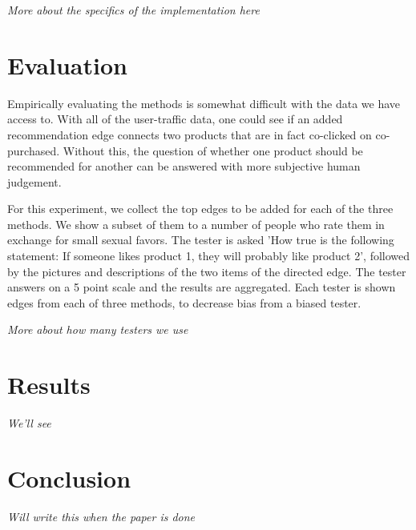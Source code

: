 \documentclass[10pt]{article}
\begin{document}
\emph{More about the specifics of the implementation here}

\section*{Evaluation}
Empirically evaluating the methods is somewhat difficult with the data we have
access to. With all of the user-traffic data, one could see if an added
recommendation edge connects two products that are in fact co-clicked on
co-purchased. Without this, the question of whether one product should be
recommended for another can be answered with more subjective human judgement.

For this experiment, we collect the top edges to be added for each of the three
methods. We show a subset of them to a number of people who rate them in
exchange for small sexual favors. The tester is asked 'How true is the
following statement: If someone likes product 1, they will probably like
product 2', followed by the pictures and descriptions of the two items of the
directed edge. The tester answers on a 5 point scale and the results are
aggregated. Each tester is shown edges from each of three methods, to decrease
bias from a biased tester.

\emph{More about how many testers we use}

\section*{Results}
\emph{We'll see}

\section*{Conclusion}
\emph{Will write this when the paper is done}
\end{document}
